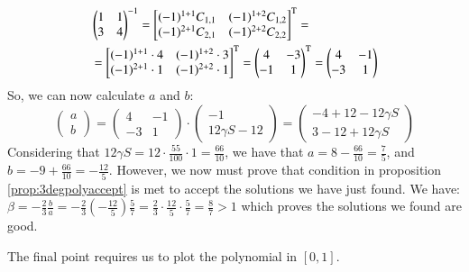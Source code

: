 \begin{align*}
&
\begin{pmatrix}
1 & 1 \\
3 & 4
\end{pmatrix}^{-1}
=
\begin{bmatrix}
(-1)^{1+1}C_{1,1} & (-1)^{1+2}C_{1,2} \\
(-1)^{2+1}C_{2,1} & (-1)^{2+2}C_{2,2}
\end{bmatrix}^\text{T}
= \notag\\
&=\begin{bmatrix}
(-1)^{1+1} \cdot 4 & (-1)^{1+2} \cdot 3 \\
(-1)^{2+1} \cdot 1 & (-1)^{2+2} \cdot 1
\end{bmatrix}^\text{T}
=
\begin{pmatrix}
4 & -3 \\
-1 & 1
\end{pmatrix}^\text{T}
=
\begin{pmatrix}
4 & -1 \\
-3 & 1
\end{pmatrix}
\end{align*}
So, we can now calculate $a$ and $b$:
\begin{equation*}
\begin{pmatrix}
a \\
b
\end{pmatrix}
=
\begin{pmatrix}
4 & -1 \\
-3 & 1
\end{pmatrix}
\cdot
\begin{pmatrix}
-1 \\
12 \gamma S - 12
\end{pmatrix}
=
\begin{pmatrix}
-4 +12 -12 \gamma S \\
3 - 12 + 12 \gamma S
\end{pmatrix}
\end{equation*}
Considering that $12 \gamma S = 12 \cdot \frac{55}{100} \cdot 1 = \frac{66}{10}$,
we have that $a = 8 - \frac{66}{10} = \frac{7}{5}$, and 
$b = -9 + \frac{66}{10} = -\frac{12}{5}$.
However, we now must prove that condition in proposition \ref{prop:3degpolyaccept}
is met to accept the solutions we have just found. We have: 
$\beta = -\frac{2}{3}\frac{b}{a} = -\frac{2}{3}\left(-\frac{12}{5}\right)\frac{5}{7} = 
 \frac{2}{3}\cdot\frac{12}{5}\cdot\frac{5}{7} = \frac{8}{7} > 1$ which proves
the solutions we found are good.

The final point requires us to plot the polynomial in $[0,1]$.

